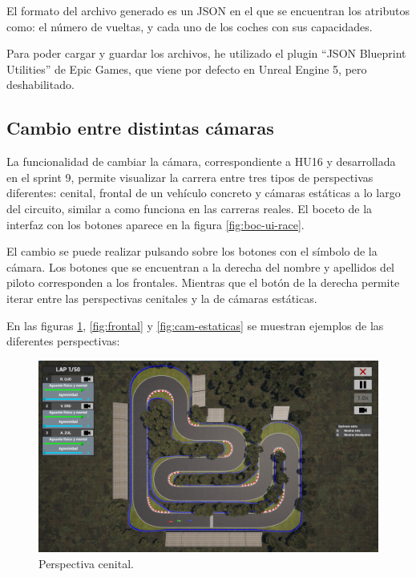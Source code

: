 \bigskip

El formato del archivo generado es un JSON en el que se encuentran los atributos como: el número de vueltas, y cada uno de los coches con sus capacidades.

\bigskip

Para poder cargar y guardar los archivos, he utilizado el plugin ``JSON Blueprint Utilities'' de Epic Games, que viene por defecto en Unreal Engine 5, pero deshabilitado.

\subsection{Cambio entre distintas cámaras}

La funcionalidad de cambiar la cámara, correspondiente a HU16 y desarrollada en el sprint 9, permite visualizar la carrera entre tres tipos de perspectivas diferentes: cenital, frontal de un vehículo concreto y cámaras estáticas a lo largo del circuito, similar a como funciona en las carreras reales. El boceto de la interfaz con los botones aparece en la figura \ref{fig:boc-ui-race}.

\bigskip

El cambio se puede realizar pulsando sobre los botones con el símbolo de la cámara. Los botones que se encuentran a la derecha del nombre y apellidos del piloto corresponden a los frontales. Mientras que el botón de la derecha permite iterar entre las perspectivas cenitales y la de cámaras estáticas.

\bigskip

En las figuras \ref{fig:cenital}, \ref{fig:frontal} y \ref{fig:cam-estaticas} se muestran ejemplos de las diferentes perspectivas:

\begin{figure}[H]
    \includegraphics[width=\textwidth]{imagenes/camera/cam-top.jpg}
    \caption{Perspectiva cenital.}
    \label{fig:cenital}
\end{figure}


